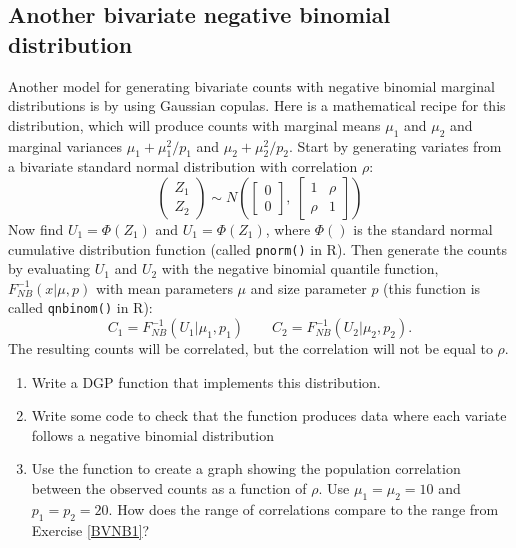 \documentclass[
]{book}
\begin{document}
\subsection{Another bivariate negative binomial distribution}\label{BVNB2}

Another model for generating bivariate counts with negative binomial marginal distributions is by using Gaussian copulas. Here is a mathematical recipe for this distribution, which will produce counts with marginal means \(\mu_1\) and \(\mu_2\) and marginal variances \(\mu_1 + \mu_1^2 / p_1\) and \(\mu_2 + \mu_2^2 / p_2\). Start by generating variates from a bivariate standard normal distribution with correlation \(\rho\):
\[
\left(\begin{array}{c}Z_1 \\ Z_2 \end{array}\right) \sim N\left(\left[\begin{array}{c}0 \\ 0\end{array}\right], \ \left[\begin{array}{cc}1  & \rho \\ \rho & 1\end{array}\right]\right)
\]
Now find \(U_1 = \Phi(Z_1)\) and \(U_1 = \Phi(Z_1)\), where \(\Phi()\) is the standard normal cumulative distribution function (called \texttt{pnorm()} in R).
Then generate the counts by evaluating \(U_1\) and \(U_2\) with the negative binomial quantile function, \(F_{NB}^{-1}(x | \mu, p)\) with mean parameters \(\mu\) and size parameter \(p\) (this function is called \texttt{qnbinom()} in R):
\[
C_1 = F_{NB}^{-1}(U_1 | \mu_1, p_1) \qquad C_2 = F_{NB}^{-1}(U_2 |  \mu_2, p_2).
\]
The resulting counts will be correlated, but the correlation will not be equal to \(\rho\).

\begin{enumerate}
\def\labelenumi{\arabic{enumi}.}
\item
  Write a DGP function that implements this distribution.
\item
  Write some code to check that the function produces data where each variate follows a negative binomial distribution
\item
  Use the function to create a graph showing the population correlation between the observed counts as a function of \(\rho\). Use \(\mu_1 = \mu_2 = 10\) and \(p_1 = p_2 = 20\). How does the range of correlations compare to the range from Exercise \ref{BVNB1}?
\end{enumerate}
\end{document}
